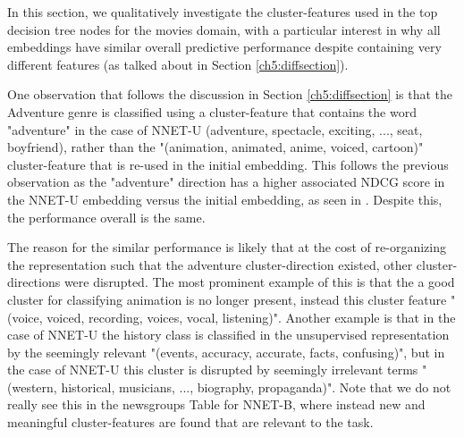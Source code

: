 In this section, we qualitatively investigate the cluster-features used in the top decision tree nodes for the movies domain, with a particular interest in why all embeddings have similar overall predictive performance despite containing very different features (as talked about in Section \ref{ch5:diffsection}).

One observation that follows the discussion in Section \ref{ch5:diffsection} is that the Adventure genre is classified using a cluster-feature that contains the word "adventure" in the case of NNET-U (adventure, spectacle, exciting, ..., seat, boyfriend), rather than the "(animation, animated, anime, voiced, cartoon)" cluster-feature that is re-used in the initial embedding. This follows the previous observation as the "adventure" direction has a higher associated NDCG score in the NNET-U embedding versus the initial embedding, as seen in \label{ch5:diff}. Despite this, the performance overall is the same. 

The reason for the similar performance is likely that at the cost of re-organizing the representation such that the adventure cluster-direction existed, other cluster-directions were disrupted. The most prominent example of this is that the a good cluster for classifying animation is no longer present, instead this  cluster feature "(voice, voiced, recording, voices, vocal, listening)". Another example is that in the case of NNET-U the history class is classified in the unsupervised representation by the seemingly relevant "(events, accuracy, accurate, facts, confusing)", but in the case of NNET-U this cluster is disrupted by seemingly irrelevant terms "(western, historical, musicians, ..., biography, propaganda)". Note that we do not really see this in the newsgroups Table \label{ch5:dtng} for NNET-B, where instead new and meaningful cluster-features are found that are relevant to the task.


